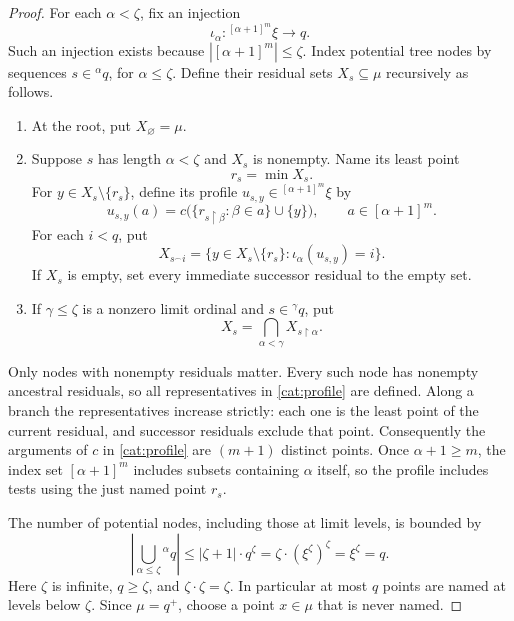 \begin{proof}
For each $\alpha<\zeta$, fix an injection
\begin{equation}\label{cat:profile-codes}
 \iota_\alpha:{}^{[\alpha+1]^m}\xi\longrightarrow q.
\end{equation}
Such an injection exists because $|[\alpha+1]^m|\le\zeta$.
Index potential tree nodes by sequences $s\in{}^\alpha q$, for
$\alpha\le\zeta$. Define their residual sets $X_s\subseteq\mu$
recursively as follows.
\begin{enumerate}[label=(\roman*)]
 \item At the root, put $X_\varnothing=\mu$.
 \item Suppose $s$ has length $\alpha<\zeta$ and $X_s$ is nonempty.
 Name its least point
 \[
  r_s=\min X_s.
 \]
 For $y\in X_s\setminus\{r_s\}$, define its profile
 $u_{s,y}\in{}^{[\alpha+1]^m}\xi$ by
 \begin{equation}\label{cat:profile}
  u_{s,y}(a)=c\bigl(\{r_{s\upharpoonright\beta}:\beta\in a\}
                    \cup\{y\}\bigr),
       \qquad a\in[\alpha+1]^m.
 \end{equation}
 For each $i<q$, put
 \[
  X_{s^\frown i}
   =\{y\in X_s\setminus\{r_s\}:\iota_\alpha(u_{s,y})=i\}.
 \]
 If $X_s$ is empty, set every immediate successor residual to the
 empty set.
 \item If $\gamma\le\zeta$ is a nonzero limit ordinal and
 $s\in{}^\gamma q$, put
 \begin{equation}\label{cat:limit-residual}
  X_s=\bigcap_{\alpha<\gamma}X_{s\upharpoonright\alpha}.
 \end{equation}
\end{enumerate}
Only nodes with nonempty residuals matter. Every such node has
nonempty ancestral residuals, so all representatives in
\eqref{cat:profile} are defined. Along a branch the representatives
increase strictly: each one is the least point of the current
residual, and successor residuals exclude that point. Consequently
the arguments of $c$ in \eqref{cat:profile} are $(m+1)$ distinct
points. Once $\alpha+1\ge m$, the index set $[\alpha+1]^m$ includes
subsets containing $\alpha$ itself, so the profile includes tests
using the just named point $r_s$.

The number of potential nodes, including those at limit levels, is
bounded by
\begin{equation}\label{cat:tree-count}
 \left|\bigcup_{\alpha\le\zeta}{}^\alpha q\right|
 \le |\zeta+1|\cdot q^\zeta
 =\zeta\cdot(\xi^\zeta)^\zeta
 =\xi^\zeta=q.
\end{equation}
Here $\zeta$ is infinite, $q\ge\zeta$, and
$\zeta\cdot\zeta=\zeta$. In particular at most $q$ points are
named at levels below $\zeta$. Since $\mu=q^+$, choose a point
$x\in\mu$ that is never named.


\end{proof}

